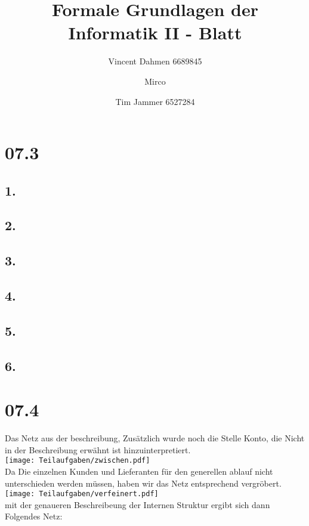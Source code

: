 \documentclass[12pt,a4paper]{article}
\title{Formale Grundlagen der Informatik II - Blatt \blattNr}
\author{Vincent Dahmen 6689845  \and Mirco \and Tim Jammer 6527284}
\def \blattNr{07}
\begin{document}
\maketitle{}

\section*{\blattNr .3}
\subsection*{1.}


\subsection*{2.}


\subsection*{3.}


\subsection*{4.}


\subsection*{5.}


\subsection*{6.}


\pagebreak

\section*{\blattNr .4}

Das Netz aus der beschreibung, Zusätzlich wurde noch die Stelle Konto, die Nicht in der Beschreibung erwähnt ist hinzuinterpretiert.\\

\texttt{[image: Teilaufgaben/zwischen.pdf]}\\
Da Die einzelnen Kunden und Lieferanten für den generellen ablauf nicht unterschieden werden müssen, haben wir das Netz entsprechend vergröbert.\\
\texttt{[image: Teilaufgaben/verfeinert.pdf]}\\
mit der genaueren Beschreibeung der Internen Struktur ergibt sich dann Folgendes Netz:\\
\end{document}
